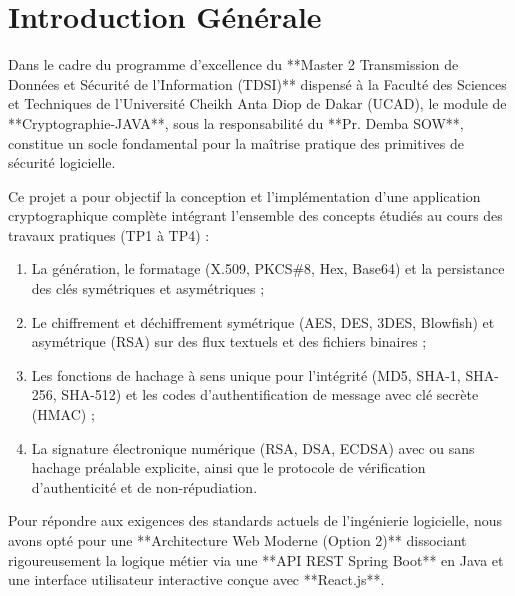\documentclass[12pt,a4paper]{report}
\begin{document}
\tableofcontents
\newpage

\chapter{Introduction Générale}

Dans le cadre du programme d'excellence du **Master 2 Transmission de Données et Sécurité de l'Information (TDSI)** dispensé à la Faculté des Sciences et Techniques de l'Université Cheikh Anta Diop de Dakar (UCAD), le module de **Cryptographie-JAVA**, sous la responsabilité du **Pr. Demba SOW**, constitue un socle fondamental pour la maîtrise pratique des primitives de sécurité logicielle.

Ce projet a pour objectif la conception et l'implémentation d'une application cryptographique complète intégrant l'ensemble des concepts étudiés au cours des travaux pratiques (TP1 à TP4) :
\begin{enumerate}
    \item La génération, le formatage (X.509, PKCS\#8, Hex, Base64) et la persistance des clés symétriques et asymétriques ;
    \item Le chiffrement et déchiffrement symétrique (AES, DES, 3DES, Blowfish) et asymétrique (RSA) sur des flux textuels et des fichiers binaires ;
    \item Les fonctions de hachage à sens unique pour l'intégrité (MD5, SHA-1, SHA-256, SHA-512) et les codes d'authentification de message avec clé secrète (HMAC) ;
    \item La signature électronique numérique (RSA, DSA, ECDSA) avec ou sans hachage préalable explicite, ainsi que le protocole de vérification d'authenticité et de non-répudiation.
\end{enumerate}

Pour répondre aux exigences des standards actuels de l'ingénierie logicielle, nous avons opté pour une **Architecture Web Moderne (Option 2)** dissociant rigoureusement la logique métier via une **API REST Spring Boot** en Java et une interface utilisateur interactive conçue avec **React.js**.

\newpage

\end{document}
